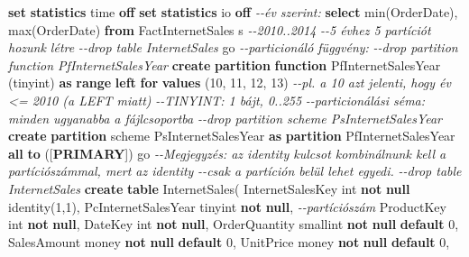 \documentclass[
  magyar,
]{article}
\newenvironment{Shaded}{}{}
\newcommand{\CommentTok}[1]{\textcolor[rgb]{0.38,0.63,0.69}{\textit{#1}}}
\newcommand{\ControlFlowTok}[1]{\textcolor[rgb]{0.00,0.44,0.13}{\textbf{#1}}}
\newcommand{\DataTypeTok}[1]{\textcolor[rgb]{0.56,0.13,0.00}{#1}}
\newcommand{\DecValTok}[1]{\textcolor[rgb]{0.25,0.63,0.44}{#1}}
\newcommand{\FunctionTok}[1]{\textcolor[rgb]{0.02,0.16,0.49}{#1}}
\newcommand{\KeywordTok}[1]{\textcolor[rgb]{0.00,0.44,0.13}{\textbf{#1}}}
\newcommand{\NormalTok}[1]{#1}
\begin{document}
\begin{Shaded}
\begin{Highlighting}[]
\KeywordTok{set} \KeywordTok{statistics} \DataTypeTok{time} \KeywordTok{off}
\KeywordTok{set} \KeywordTok{statistics}\NormalTok{ io }\KeywordTok{off}
\CommentTok{{-}{-}év szerint:}
\KeywordTok{select} \FunctionTok{min}\NormalTok{(OrderDate), }\FunctionTok{max}\NormalTok{(OrderDate)  }\KeywordTok{from}\NormalTok{ FactInternetSales s   }\CommentTok{{-}{-}2010..2014}
\CommentTok{{-}{-}5 évhez 5 partíciót hozunk létre}
\CommentTok{{-}{-}drop table InternetSales}
\NormalTok{go}
\CommentTok{{-}{-}particionáló függvény:}
\CommentTok{{-}{-}drop partition function PfInternetSalesYear}
\KeywordTok{create} \KeywordTok{partition} \KeywordTok{function}\NormalTok{ PfInternetSalesYear (tinyint) }\KeywordTok{as} \KeywordTok{range} \KeywordTok{left} \ControlFlowTok{for} \KeywordTok{values}\NormalTok{ (}\DecValTok{10}\NormalTok{,}
\DecValTok{11}\NormalTok{, }\DecValTok{12}\NormalTok{, }\DecValTok{13}\NormalTok{)}
\CommentTok{{-}{-}pl. a \textquotesingle{}10\textquotesingle{} azt jelenti, hogy év \textless{}= 2010 (a LEFT miatt)}
\CommentTok{{-}{-}TINYINT: 1 bájt, 0..255}
\CommentTok{{-}{-}particionálási séma: minden ugyanabba a fájlcsoportba}
\CommentTok{{-}{-}drop partition scheme PsInternetSalesYear}
\KeywordTok{create} \KeywordTok{partition}\NormalTok{ scheme PsInternetSalesYear }\KeywordTok{as} \KeywordTok{partition}\NormalTok{ PfInternetSalesYear }\KeywordTok{all} \KeywordTok{to}
\NormalTok{([}\KeywordTok{PRIMARY}\NormalTok{])}
\NormalTok{go}
\CommentTok{{-}{-}Megjegyzés: az identity kulcsot kombinálnunk kell a partíciószámmal, mert az identity}
\CommentTok{{-}{-}csak a partíción belül lehet egyedi.}
\CommentTok{{-}{-}drop table InternetSales}
\KeywordTok{create} \KeywordTok{table}\NormalTok{ InternetSales(}
\NormalTok{   InternetSalesKey }\DataTypeTok{int} \KeywordTok{not} \KeywordTok{null}\NormalTok{ identity(}\DecValTok{1}\NormalTok{,}\DecValTok{1}\NormalTok{),}
\NormalTok{   PcInternetSalesYear tinyint }\KeywordTok{not} \KeywordTok{null}\NormalTok{,  }\CommentTok{{-}{-}partíciószám}
\NormalTok{   ProductKey }\DataTypeTok{int} \KeywordTok{not} \KeywordTok{null}\NormalTok{,}
\NormalTok{   DateKey }\DataTypeTok{int} \KeywordTok{not} \KeywordTok{null}\NormalTok{,}
\NormalTok{   OrderQuantity }\DataTypeTok{smallint} \KeywordTok{not} \KeywordTok{null} \KeywordTok{default} \DecValTok{0}\NormalTok{,}
\NormalTok{   SalesAmount money }\KeywordTok{not} \KeywordTok{null} \KeywordTok{default} \DecValTok{0}\NormalTok{,}
\NormalTok{   UnitPrice money }\KeywordTok{not} \KeywordTok{null} \KeywordTok{default} \DecValTok{0}\NormalTok{,}

\end{Highlighting}
\end{Shaded}
\end{document}
